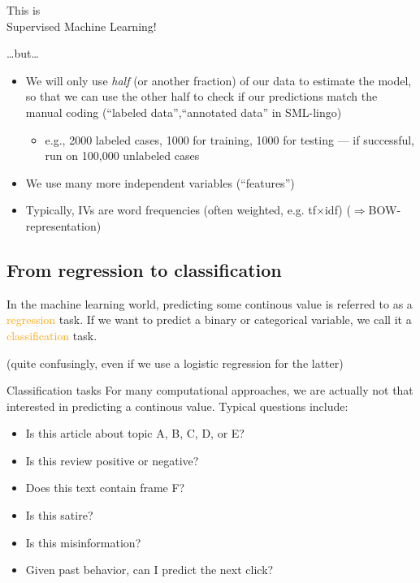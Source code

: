 \documentclass[compress]{beamer}
\begin{document}
\begin{frame}{}
	\huge{This is\\ Supervised Machine Learning!}
\end{frame}

\begin{frame}{\ldots but\ldots}
	\begin{itemize}
		\item<1-> We will only use \emph{half} {\tiny{(or another fraction)}} of our data to estimate the model, so that we can use the other half to check if our predictions match the manual coding (``labeled data'',``annotated data'' in SML-lingo)
		\begin{itemize}
			\item<2->e.g., 2000 labeled cases, 1000 for training, 1000 for testing --- if successful, run on 100,000 unlabeled cases
		\end{itemize}
		\item<3-> We use many more independent variables (``features'')
		\item<4-> Typically, IVs are word frequencies (often weighted, e.g. tf$\times$idf) ($\Rightarrow$BOW-representation)
	\end{itemize}
\end{frame}


\subsection{From regression to classification}

\begin{frame}[standout]
	In the machine learning world, predicting some continous value is referred to as a \textcolor{orange}{regression} task. If we want to predict a binary or categorical variable, we call it a \textcolor{orange}{classification} task.
	
	(quite confusingly, even if we use a logistic regression for the latter)
\end{frame}


\begin{frame}{Classification tasks}
	For many computational approaches, we are actually not that interested in predicting a continous value. Typical questions include:
	\begin{itemize}
		\item Is this article about topic A, B, C, D, or E?
		\item Is this review positive or negative?
		\item Does this text contain frame F?
		\item Is this satire? 
		\item Is this misinformation?
		\item Given past behavior, can I predict the next click?
	\end{itemize}
\end{frame}
\end{document}
